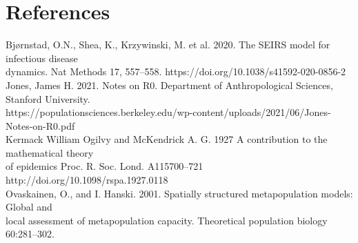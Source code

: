 \documentclass[12pt]{article}
\begin{document}
\newpage

\section*{References}
 
 \noindent
Bjørnstad, O.N., Shea, K., Krzywinski, M. et al. 2020. The SEIRS model for infectious disease \\
\indent dynamics. Nat Methods 17, 557–558. https://doi.org/10.1038/s41592-020-0856-2\\

\noindent
Jones, James H. 2021. Notes on R0. Department of Anthropological Sciences, Stanford University.\\ 
\indent https://populationsciences.berkeley.edu/wp-content/uploads/2021/06/Jones-Notes-on-R0.pdf\\

\noindent
Kermack William Ogilvy and McKendrick A. G. 1927 A contribution to the mathematical theory\\
\indent of epidemics Proc. R. Soc. Lond. A115700–721 http://doi.org/10.1098/rspa.1927.0118\\

\noindent
Ovaskainen, O., and I. Hanski. 2001. Spatially structured metapopulation models: Global and \\
\indent local assessment of metapopulation capacity. Theoretical population biology 60:281–302.
\end{document}
